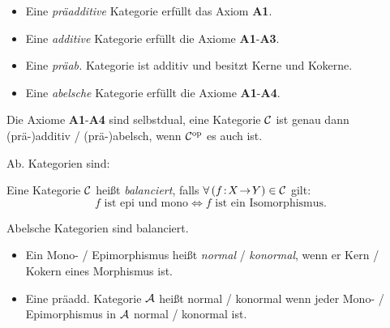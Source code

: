 \documentclass{cheat-sheet}
\begin{document}

\begin{defn}
  \begin{itemize}
    \item Eine \emph{präadditive} Kategorie erfüllt das Axiom \textbf{A1}. \\
    \item Eine \emph{additive} Kategorie erfüllt die Axiome \textbf{A1}-\textbf{A3}. \\
    \item Eine \emph{präab.} Kategorie ist additiv und besitzt Kerne und Kokerne.
    \item Eine \emph{abelsche} Kategorie erfüllt die Axiome \textbf{A1}-\textbf{A4}.
  \end{itemize}
\end{defn}

\begin{bem}
  Die Axiome \textbf{A1}-\textbf{A4} sind selbstdual, \dh{} eine Kategorie $\mathcal{C}$ ist genau dann (prä-)additiv / (prä-)abelsch, wenn $\mathcal{C}^{\mathrm{op}}$ es auch ist.
\end{bem}

\begin{bspe}
  Ab. Kategorien sind: \enspace
  \inlineitem{$\AbGrp$,} \enspace
   \enspace
\end{bspe}

\begin{defn}
  Eine Kategorie $\mathcal{C}$ heißt \emph{balanciert}, falls $\forall \, (f \!:\! X \!\to\! Y) \in \mathcal{C}$ gilt:
  \[ f \text{ ist epi und mono} \iff f \text{ ist ein Isomorphismus.} \]
\end{defn}

\begin{prop}
  Abelsche Kategorien sind balanciert.
\end{prop}

\begin{defn}
  \begin{itemize}
    \item Ein Mono- / Epimorphismus heißt \emph{normal} / \emph{konormal}, wenn er Kern / Kokern eines Morphismus ist.
    \item Eine präadd. Kategorie $\mathcal{A}$ heißt normal / konormal wenn jeder Mono- / Epimorphismus in $\mathcal{A}$ normal / konormal ist.
  \end{itemize}
\end{defn}
\end{document}
